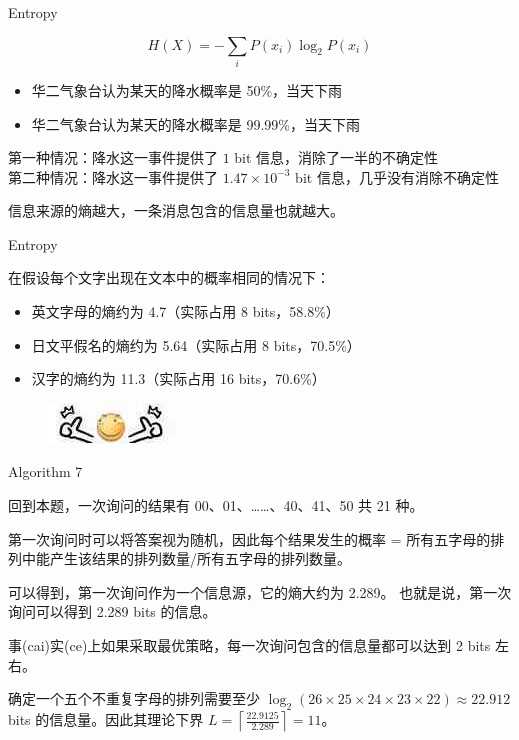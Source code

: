 \documentclass[UTF8]{beamer}
\begin{document}
\begin{frame}{Entropy}

$$
    H(X) = -\sum_{i} P(x_i) \log_2 P(x_i)
$$

\begin{itemize}
    \item {}华二气象台认为某天的降水概率是 50\%，当天下雨
    \item {}华二气象台认为某天的降水概率是 99.99\%，当天下雨
\end{itemize}

\pause
第一种情况：降水这一事件提供了 $1$ bit 信息，消除了一半的不确定性\\
第二种情况：降水这一事件提供了 $1.47 \times 10^{-3}$ bit 信息，几乎没有消除不确定性\newline\newline

信息来源的熵越大，一条消息包含的信息量也就越大。

\end{frame}

\begin{frame}{Entropy}

在假设每个文字出现在文本中的概率相同的情况下：
\begin{itemize}
    \item 英文字母的熵约为 4.7（实际占用 8 bits，58.8\%）
    \item 日文平假名的熵约为 5.64（实际占用 8 bits，70.5\%）
    \item 汉字的熵约为 11.3（实际占用 16 bits，70.6\%）
\end{itemize}
\pause
\begin{figure}[h]\centering
\includegraphics[scale=0.028]{uu.jpg}
\end{figure}

\end{frame}

\begin{frame}{Algorithm 7}

回到本题，一次询问的结果有 00、01、……、40、41、50 共 21 种。

\pause
第一次询问时可以将答案视为随机，因此每个结果发生的概率 = %
所有五字母的排列中能产生该结果的排列数量/所有五字母的排列数量。

\pause
可以得到，第一次询问作为一个信息源，它的熵大约为 2.289。%
也就是说，第一次询问可以得到 2.289 bits 的信息。

事(cai)实(ce)上如果采取最优策略，每一次询问包含的信息量都可以达到 2 bits 左右。

\pause
确定一个五个不重复字母的排列需要至少 %
$\log_{2} (26 \times 25 \times 24 \times 23 \times 22) \approx 22.912$ %
bits 的信息量。因此其理论下界 $L = \left\lceil \frac{22.9125}{2.289} \right\rceil = 11$。

\end{frame}
\end{document}

